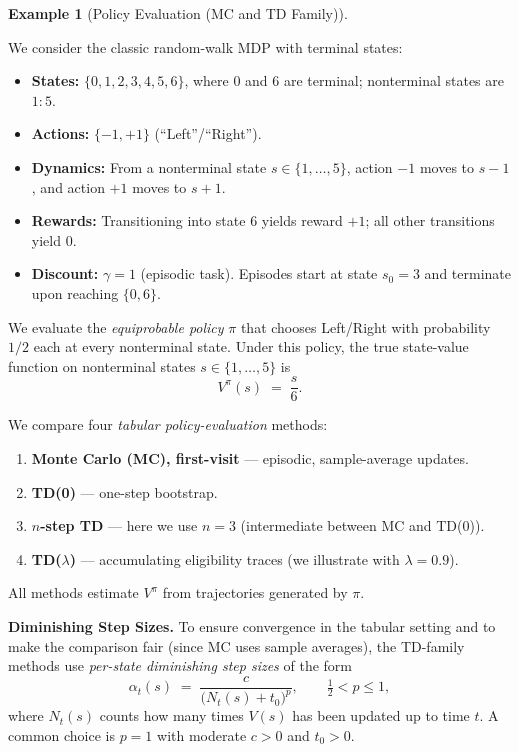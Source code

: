 \documentclass[
]{book}
\providecommand{\tightlist}{%
  \setlength{\itemsep}{0pt}\setlength{\parskip}{0pt}}
\theoremstyle{definition}
\theoremstyle{definition}
\newtheorem{example}{Example}[chapter]
\theoremstyle{definition}
\theoremstyle{definition}
\theoremstyle{remark}
\begin{document}
\begin{example}[Policy Evaluation (MC and TD Family)]
\protect\hypertarget{exm:PolicyEvaluationRandomWalk}{}\label{exm:PolicyEvaluationRandomWalk}

We consider the classic random-walk MDP with terminal states:

\begin{itemize}
\tightlist
\item
  \textbf{States:} \(\{0,1,2,3,4,5,6\}\), where \(0\) and \(6\) are terminal; nonterminal states are \(1{:}5\).
\item
  \textbf{Actions:} \(\{-1,+1\}\) (``Left''/``Right'').
\item
  \textbf{Dynamics:} From a nonterminal state \(s\in\{1,\dots,5\}\), action \(-1\) moves to \(s-1\), and action \(+1\) moves to \(s+1\).
\item
  \textbf{Rewards:} Transitioning into state \(6\) yields reward \(+1\); all other transitions yield \(0\).
\item
  \textbf{Discount:} \(\gamma=1\) (episodic task). Episodes start at state \(s_0=3\) and terminate upon reaching \(\{0,6\}\).
\end{itemize}

We evaluate the \emph{equiprobable policy} \(\pi\) that chooses Left/Right with probability \(1/2\) each at every nonterminal state. Under this policy, the true state-value function on nonterminal states \(s\in\{1,\dots,5\}\) is
\begin{equation}
V^\pi(s) \;=\; \frac{s}{6}.
\label{eq:trueV-rw}
\end{equation}

We compare four \emph{tabular policy-evaluation} methods:

\begin{enumerate}
\def\labelenumi{\arabic{enumi}.}
\item
  \textbf{Monte Carlo (MC), first-visit} --- episodic, sample-average updates.
\item
  \textbf{TD(0)} --- one-step bootstrap.
\item
  \textbf{\(n\)-step TD} --- here we use \(n=3\) (intermediate between MC and TD(0)).
\item
  \textbf{TD(\(\lambda\))} --- accumulating eligibility traces (we illustrate with \(\lambda=0.9\)).
\end{enumerate}

All methods estimate \(V^\pi\) from trajectories generated by \(\pi\).

\textbf{Diminishing Step Sizes.}
To ensure convergence in the tabular setting and to make the comparison fair (since MC uses sample averages), the TD-family methods use \emph{per-state diminishing step sizes} of the form
\begin{equation}
\alpha_t(s) \;=\; \frac{c}{\big(N_t(s)+t_0\big)^p}, 
\qquad \tfrac{1}{2} < p \le 1,
\label{eq:per-state-decay}
\end{equation}
where \(N_t(s)\) counts how many times \(V(s)\) has been updated up to time \(t\). A common choice is \(p=1\) with moderate \(c>0\) and \(t_0>0\).


\end{example}
\end{document}
